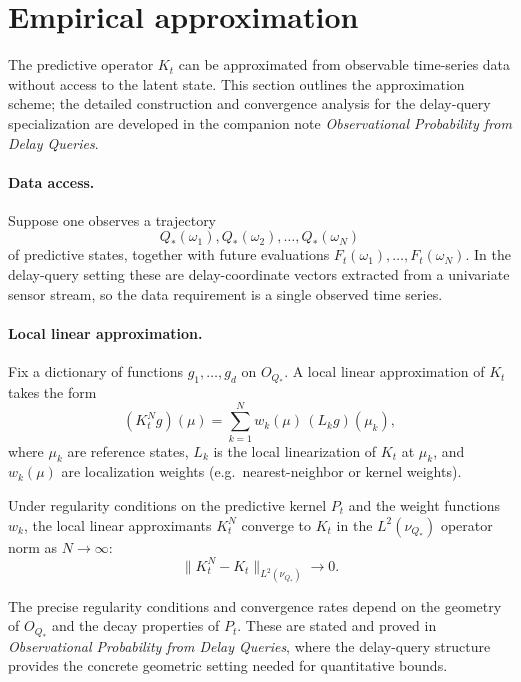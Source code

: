 \section{Empirical approximation}\label{sec:empirical}

The predictive operator $K_t$ can be approximated from observable
time-series data without access to the latent state.  This section
outlines the approximation scheme; the detailed construction and
convergence analysis for the delay-query specialization are developed
in the companion note \emph{Observational Probability from Delay
Queries}.

\paragraph{Data access.}
Suppose one observes a trajectory
\[
Q_*(\omega_1), Q_*(\omega_2), \ldots, Q_*(\omega_N)
\]
of predictive states, together with future evaluations
$F_t(\omega_1), \ldots, F_t(\omega_N)$.  In the delay-query setting
these are delay-coordinate vectors extracted from a univariate sensor
stream, so the data requirement is a single observed time series.

\paragraph{Local linear approximation.}
Fix a dictionary of functions $g_1,\ldots,g_d$ on $O_{Q_*}$.
A local linear approximation of $K_t$ takes the form
\[
(K_t^N g)(\mu) = \sum_{k=1}^N w_k(\mu)\,(L_k g)(\mu_k),
\]
where $\mu_k$ are reference states, $L_k$ is the local linearization
of $K_t$ at $\mu_k$, and $w_k(\mu)$ are localization weights
(e.g.\ nearest-neighbor or kernel weights).

\begin{proposition}
Under regularity conditions on the predictive kernel $P_t$ and the
weight functions $w_k$, the local linear approximants $K_t^N$ converge
to $K_t$ in the $L^2(\nu_{Q_*})$ operator norm as $N\to\infty$:
\[
\|K_t^N - K_t\|_{L^2(\nu_{Q_*})} \to 0.
\]
\end{proposition}

\begin{remark}
The precise regularity conditions and convergence rates depend on the
geometry of $O_{Q_*}$ and the decay properties of $P_t$.  These are
stated and proved in \emph{Observational Probability from Delay
Queries}, where the delay-query structure provides the concrete
geometric setting needed for quantitative bounds.
\end{remark}

